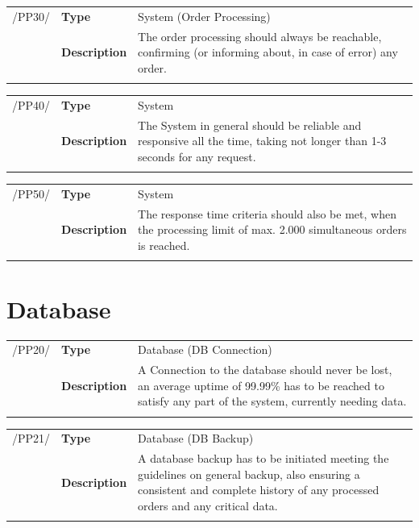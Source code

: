 \documentclass[11pt,a4paper,oneside,svgnames]{report}
\begin{document}
\noindent
\begin{tabular}{llp{8cm}}
\cellcolor{white}/PP30/	& \textbf{Type}			& System (Order Processing)\\
\cellcolor{white}		& \textbf{Description}	& The order processing should always be reachable, confirming (or informing about, in case of error) any order.\\
\cellcolor{white}		\hfill \\
\end{tabular}

\noindent
\begin{tabular}{llp{8cm}}
\cellcolor{white}/PP40/	& \textbf{Type}			& System\\
\cellcolor{white}		& \textbf{Description}	& The System in general should be reliable and responsive all the time, taking not longer than 1-3 seconds for any request.\\
\cellcolor{white}		\hfill \\
\end{tabular}

\noindent
\begin{tabular}{llp{8cm}}
\cellcolor{white}/PP50/	& \textbf{Type}			& System\\
\cellcolor{white}		& \textbf{Description}	& The response time criteria should also be met, when the processing limit of max. 2.000 simultaneous orders is reached.\\
\cellcolor{white}		\hfill \\
\end{tabular}

\section{Database}

\noindent
\begin{tabular}{llp{8cm}}
\cellcolor{white}/PP20/	& \textbf{Type}			& Database (DB Connection)\\
\cellcolor{white}		& \textbf{Description}	& A Connection to the database should never be lost, an average uptime of 99.99\% has to be reached to satisfy any part of the system, currently needing data.\\
\cellcolor{white}		\hfill \\
\end{tabular}

\noindent
\begin{tabular}{llp{8cm}}
\cellcolor{white}/PP21/	& \textbf{Type}			& Database (DB Backup)\\
\cellcolor{white}		& \textbf{Description}	& A database backup has to be initiated meeting the guidelines on general backup, also ensuring a consistent and complete history of any processed orders and any critical data.\\
\cellcolor{white}		\hfill \\
\end{tabular}
\end{document}
